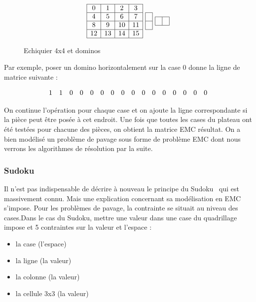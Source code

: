\documentclass[a4paper]{article}
\begin{document}
\begin{figure}[h]
\centering
{}
\[
  \begin{array}{|c|c|c|c|}
		\hline
   	0 & 1 & 2 & 3 \\
		\hline
    4	& 5 & 6 & 7 \\
		\hline
   	8 & 9 & 10 & 11 \\
		\hline
   	12 & 13 & 14 & 15 \\
		\hline
\end{array}
	\textrm{ }
\begin{array}{ |c| }
	\hline
		\\
	\hline
    \\
	\hline
  \end{array}
	\textrm{ }
\begin{array}{ |c|c| }
	\hline
		& \\ 
	\hline
  \end{array}
\]
\caption{\label{chessboard4x4} Echiquier 4x4 et dominos}
\end{figure}

Par exemple, poser un domino horizontalement sur la case 0 donne la ligne
de matrice suivante : 

\[
  \begin{array}{ c c c c c c c c c c c c c c c c }
	1 & 1 & 0 & 0 & 0 & 0 & 0 & 0 & 0 & 0 & 0 & 0 & 0 & 0 & 0 & 0 
  \end{array}
\]

On continue l'opération pour chaque case et on ajoute la ligne correspondante
si la pièce peut être posée à cet endroit. 
Une fois que toutes les cases du plateau ont été testées pour chacune des pièces,
on obtient la matrice EMC résultat. On a bien modélisé un problème de pavage 
sous forme de problème EMC dont nous verrons les algorithmes de résolution par
la suite.

\subsubsection{Sudoku}

Il n'est pas indispensable de décrire à nouveau le principe du 
Sudoku~\cite{sudoku} qui est massivement connu. Mais une explication concernant
sa modélisation en EMC s'impose.
Pour les problèmes de pavage, la contrainte se situait au niveau des cases.Dans
le cas du Sudoku, mettre une valeur dans une case du quadrillage impose et
5 contraintes sur la valeur et l'espace : 
\begin{itemize}
\item la case (l'espace)
\item la ligne (la valeur)
\item la colonne (la valeur)
\item la cellule 3x3 (la valeur)
\end{itemize}
\end{document}
